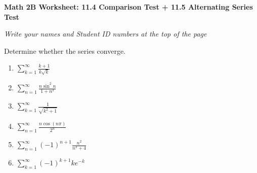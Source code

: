 \documentclass[12pt,fleqn]{article}
\begin{document}
\begin{center}
	\textbf{Math 2B Worksheet: 11.4 Comparison Test + 11.5 Alternating Series Test}
\end{center}

\emph{Write your names and Student ID numbers at the top of the page}

Determine whether the series converge.
\begin{enumerate}
\item $\displaystyle \sum_{k=1}^\infty\frac{k+1}{k\sqrt{k}}$\vfill

\item $\displaystyle \sum_{n=1}^\infty\frac{n\sin^2 n}{1+n^3}$\vfill

\item $\displaystyle \sum_{k=1}^\infty\frac{1}{\sqrt{k^2+1}}$\vfill


\newpage

\item $\displaystyle \sum_{n=1}^\infty\frac{n\cos(n\pi)}{2^n}$\vfill




\item $\displaystyle \sum_{n=1}^\infty(-1)^{n+1}\frac{n^2}{n^3+4}$\vfill

\item $\displaystyle \sum_{k=1}^\infty(-1)^{k+1}ke^{-k}$\vfill





\end{enumerate}
\end{document}
